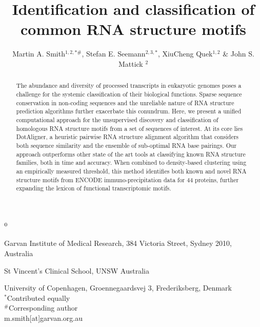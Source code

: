 \documentclass[a4paper,11pt]{article}
\title{Identification and classification of common RNA structure motifs }
\author{Martin A. Smith$^{1,2,*\#}$, Stefan E. Seemann$^{2,3,*}$, XiuCheng Quek$^{1,2}$ \& John S. Mattick $^2$}
\newenvironment{affiliations}{%
    \setcounter{enumi}{1}%
    \setlength{\parindent}{0in}%
    \slshape\sloppy%
    \begin{list}{\upshape$^{\arabic{enumi}}$}{%
        \usecounter{enumi}%
        \setlength{\leftmargin}{0in}%
        \setlength{\topsep}{0in}%
        \setlength{\labelsep}{0in}%
        \setlength{\labelwidth}{0in}%
        \setlength{\listparindent}{0in}%
        \setlength{\itemsep}{0ex}%
        \setlength{\parsep}{0in}%
        }
    }{\end{list}\par\vspace{12pt}}
\begin{document}
\maketitle

\begin{affiliations}
\item Garvan Institute of Medical Research, 384 Victoria Street, Sydney 2010, Australia
\item  St Vincent’s Clinical School, UNSW Australia
\item University of Copenhagen, Groennegaardsvej 3, Frederiksberg, Denmark\\
 $^*$Contributed equally\\
 $^\#$Corresponding author\\
 m.smith[at]garvan.org.au 
\end{affiliations}


\begin{abstract}
\noindent  The abundance  and diversity of processed transcripts in eukaryotic genomes poses a challenge 
for the systemic classification of their biological functions. Sparse sequence conservation in 
non-coding sequences and the unreliable nature of RNA structure prediction algorithms further 
exacerbate this conundrum. Here, we present a unified computational approach for the 
unsupervised discovery and classification of homologous RNA structure motifs from a set of 
sequences of interest.  At its core lies DotAligner, a heuristic pairwise RNA structure alignment 
algorithm that considers both sequence similarity and the ensemble of sub-optimal RNA base pairings.  
Our approach outperforms other state of the art tools at classifying known RNA structure families, 
both in time and accuracy. When combined to density-based clustering using an empirically measured 
threshold, this method identifies both known and novel RNA structure motifs from ENCODE 
immuno-precipitation data for 44 proteins, further expanding the lexicon of functional transcriptomic motifs. 
\end{abstract}
\end{document}
